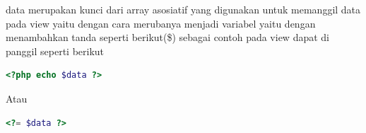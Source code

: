 data merupakan kunci dari array asosiatif yang digunakan untuk memanggil data pada view yaitu dengan cara merubanya menjadi variabel yaitu dengan menambahkan tanda seperti berikut(\$) sebagai contoh pada view dapat di panggil seperti berikut  

\begin{lstlisting}[language=PHP]
<?php echo $data ?>
\end{lstlisting}
Atau 
\begin{lstlisting}[language=PHP]
<?= $data ?>
\end{lstlisting}
\begin{lstlisting}[language=PHP]

\end{lstlisting}
%









